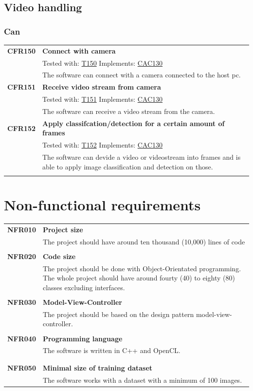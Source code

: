 \documentclass[parskip=full]{scrartcl}
\begin{document}
\subsection{Video handling}
\subsubsection{Can}
\begin{tabular}{p{2cm}p{11.4cm}}
\textbf{CFR150} \hypertarget{CFR150} & \textbf{Connect with camera}\\
& Tested with: \hyperlink{T150}{T150} Implements: \hyperlink{CAC130}{CAC130} \\
& The software can connect with a camera connected to the \gls{host pc}.\\
\textbf{CFR151} \hypertarget{CFR151} & \textbf{Receive video stream from camera}\\
& Tested with: \hyperlink{T151}{T151} Implements: \hyperlink{CAC130}{CAC130}\\
& The software can receive a video stream from the camera.\\
\textbf{CFR152} \hypertarget{CFR152} & \textbf{Apply classifcation/detection for a certain amount of frames}\\
& Tested with: \hyperlink{T152}{T152} Implements: \hyperlink{CAC130}{CAC130}\\
& The software can devide a video or videostream into frames and is able to apply \gls{image classification} and detection on those.\\
& \\
\end{tabular}


\section{Non-functional requirements}
\begin{tabular}{p{2cm}p{11.4cm}}
\textbf{NFR010} & \textbf{Project size}\\
& The project should have around ten thousand (10,000) lines of code \\
& \\
\textbf{NFR020} & \textbf{Code size}\\
& The project should be done with Object-Orientated programming. The whole project should have around fourty (40) to eighty (80) classes excluding interfaces. \\
& \\
\textbf{NFR030} & \textbf{Model-View-Controller}\\
& The project should be based on the design pattern model-view-controller. \\
& \\
\textbf{NFR040} & \textbf{Programming language}\\
& The software is written in C++ and OpenCL.\\
& \\
& \\
\textbf{NFR050} & \textbf{Minimal size of training dataset}\\
& The software works with a dataset with a minimum of 100 images.
\end{tabular}
\end{document}
